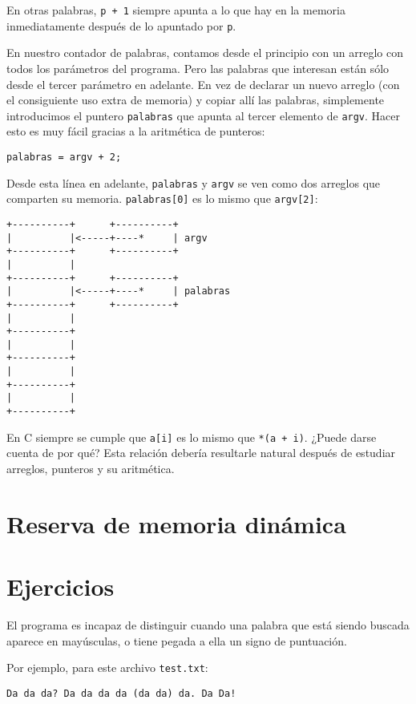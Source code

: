 En otras palabras, \lstinline!p + 1! siempre apunta a lo que hay en la
memoria inmediatamente después de lo apuntado por \lstinline!p!.

En nuestro contador de palabras, contamos desde el principio con un
arreglo con todos los parámetros del programa. Pero las palabras que
interesan están sólo desde el tercer parámetro en adelante. En vez de
declarar un nuevo arreglo (con el consiguiente uso extra de memoria) y
copiar allí las palabras, simplemente introducimos el puntero
\lstinline!palabras! que apunta al tercer elemento de \lstinline!argv!.
Hacer esto es muy fácil gracias a la aritmética de punteros:

\begin{lstlisting}
palabras = argv + 2;
\end{lstlisting}

Desde esta línea en adelante, \lstinline!palabras! y \lstinline!argv! se
ven como dos arreglos que comparten su memoria. \lstinline!palabras[0]!
es lo mismo que \lstinline!argv[2]!:

\begin{lstlisting}
+----------+      +----------+
|          |<-----+----*     | argv
+----------+      +----------+
|          |
+----------+      +----------+
|          |<-----+----*     | palabras
+----------+      +----------+
|          |
+----------+
|          |
+----------+
|          |
+----------+
|          |
+----------+
\end{lstlisting}

En C siempre se cumple que \lstinline!a[i]! es lo mismo que
\lstinline!*(a + i)!. ¿Puede darse cuenta de por qué? Esta relación
debería resultarle natural después de estudiar arreglos, punteros y su
aritmética.

\section{Reserva de memoria dinámica}

\section{Ejercicios}

El programa es incapaz de distinguir cuando una palabra que está siendo
buscada aparece en mayúsculas, o tiene pegada a ella un signo de
puntuación.

Por ejemplo, para este archivo \lstinline!test.txt!:

\begin{lstlisting}
Da da da? Da da da da (da da) da. Da Da!
\end{lstlisting}

